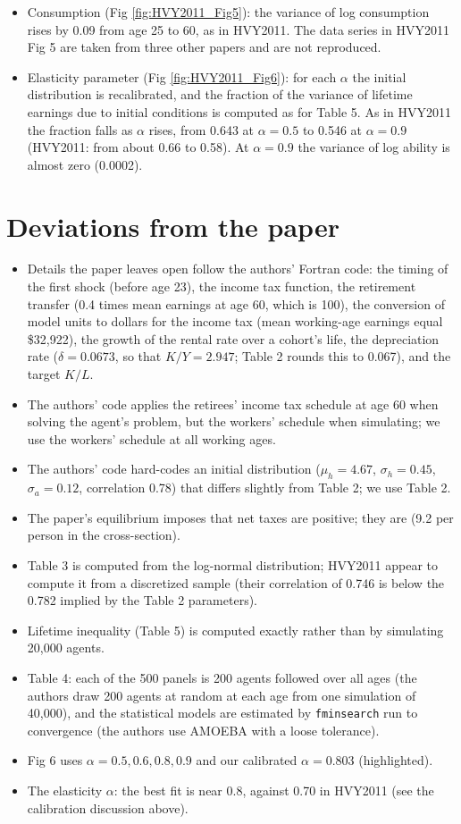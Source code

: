 \documentclass[11pt,fleqn]{article}
\begin{document}
\begin{itemize}
 \item Consumption (Fig \ref{fig:HVY2011_Fig5}): the variance of log consumption rises by 0.09 from age 25 to 60, as in HVY2011. The data series in HVY2011 Fig 5 are taken from three other papers and are not reproduced.
 \item Elasticity parameter (Fig \ref{fig:HVY2011_Fig6}): for each $\alpha$ the initial distribution is recalibrated, and the fraction of the variance of lifetime earnings due to initial conditions is computed as for Table 5. As in HVY2011 the fraction falls as $\alpha$ rises, from 0.643 at $\alpha=0.5$ to 0.546 at $\alpha=0.9$ (HVY2011: from about 0.66 to 0.58). At $\alpha=0.9$ the variance of log ability is almost zero (0.0002).
\end{itemize}


\section{Deviations from the paper}

\begin{itemize}
 \item Details the paper leaves open follow the authors' Fortran code: the timing of the first shock (before age 23), the income tax function, the retirement transfer (0.4 times mean earnings at age 60, which is 100), the conversion of model units to dollars for the income tax (mean working-age earnings equal \$32,922), the growth of the rental rate over a cohort's life, the depreciation rate ($\delta=0.0673$, so that $K/Y=2.947$; Table 2 rounds this to 0.067), and the target $K/L$.
 \item The authors' code applies the retirees' income tax schedule at age 60 when solving the agent's problem, but the workers' schedule when simulating; we use the workers' schedule at all working ages.
 \item The authors' code hard-codes an initial distribution ($\mu_h=4.67$, $\sigma_h=0.45$, $\sigma_a=0.12$, correlation 0.78) that differs slightly from Table 2; we use Table 2.
 \item The paper's equilibrium imposes that net taxes are positive; they are (9.2 per person in the cross-section).
 \item Table 3 is computed from the log-normal distribution; HVY2011 appear to compute it from a discretized sample (their correlation of 0.746 is below the 0.782 implied by the Table 2 parameters).
 \item Lifetime inequality (Table 5) is computed exactly rather than by simulating 20,000 agents.
 \item Table 4: each of the 500 panels is 200 agents followed over all ages (the authors draw 200 agents at random at each age from one simulation of 40,000), and the statistical models are estimated by \verb|fminsearch| run to convergence (the authors use AMOEBA with a loose tolerance).
 \item Fig 6 uses $\alpha=0.5,0.6,0.8,0.9$ and our calibrated $\alpha=0.803$ (highlighted).
 \item The elasticity $\alpha$: the best fit is near 0.8, against 0.70 in HVY2011 (see the calibration discussion above).
\end{itemize}
\end{document}
